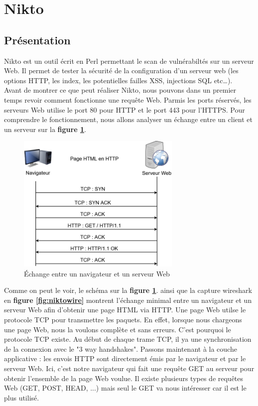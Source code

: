 \section{Nikto}

\subsection{Présentation}
Nikto est un outil écrit en Perl permettant le scan de vulnérabiltés sur un serveur Web. Il permet de tester la sécurité de la configuration d'un serveur web (les options HTTP, les index, les potentielles failles XSS, injections SQL etc…).\\
Avant de montrer ce que peut réaliser Nikto, nous pouvons dans un premier temps revoir comment fonctionne une requête Web. Parmis les ports réservés, les serveurs Web utilise le port 80 pour HTTP et le port 443 pour l'HTTPS. Pour comprendre le fonctionnement, nous allons analyser un échange entre un client et un serveur sur la \textbf{figure \ref{fig:webdiag}}.\\



\begin{figure}[t]
  \centering
  \setlength\figureheight{7cm}
  \setlength\figurewidth{9cm}
  \includegraphics[width=0.7\textwidth]{oui/Ancien/imangeancien/Nikto/wEBDiagram.png}
  \caption{Échange entre un navigateur et un serveur Web}
  \label{fig:webdiag}
\end{figure}


Comme on peut le voir, le schéma sur la \textbf{figure \ref{fig:webdiag}}. ainsi que la capture wireshark en \textbf{figure \ref{fig:niktowire}} montrent l'échange minimal entre un navigateur et un serveur Web afin d'obtenir une page HTML via HTTP. Une page Web utilse le protocole TCP pour transmettre les paquets. En effet, lorsque nous chargeons une page Web, nous la voulons complète et sans erreurs. C'est pourquoi le protocole TCP existe. Au début de chaque trame TCP, il ya une synchronisation de la connexion avec le "3 way handshakes". Passons maintenant à la couche applicative : les envois HTTP sont directement émis par le navigateur et par le serveur Web. Ici, c'est notre navigateur qui fait une requête GET au serveur pour obtenir l'ensemble de la page Web voulue. Il existe plusieurs types de requêtes Web (GET, POST, HEAD, ...) mais seul le GET va nous intéresser car il est le plus utilisé. 

